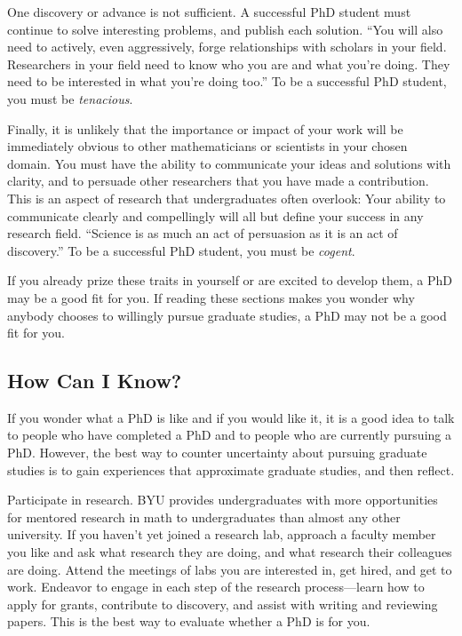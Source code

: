 \documentclass[11pt]{article}
\begin{document}
One discovery or advance is not sufficient. A successful PhD student must continue to solve interesting problems, and publish each solution. ``You will also need to actively, even aggressively, forge relationships with scholars in your field. Researchers in your field need to know who you are and what you're doing. They need to be interested in what you're doing too.'' To be a successful PhD student, you must be \emph{tenacious}.

Finally, it is unlikely that the importance or impact of your work will be immediately obvious to other mathematicians or scientists in your chosen domain. You must have the ability to communicate your ideas and solutions with clarity, and to persuade other researchers that you have made a contribution. This is an aspect of research that undergraduates often overlook: Your ability to communicate clearly and compellingly will all but define your success in any research field. ``Science is as much an act of persuasion as it is an act of discovery.'' To be a successful PhD student, you must be \emph{cogent}.

If you already prize these traits in yourself or are excited to develop them, a PhD may be a good fit for you. If reading these sections makes you wonder why anybody chooses to willingly pursue graduate studies, a PhD may not be a good fit for you.

\subsection{How Can I Know?}
If you wonder what a PhD is like and if you would like it, it is a good idea to talk to people who have completed a PhD and to people who are currently pursuing a PhD. However, the best way to counter uncertainty about pursuing graduate studies is to gain experiences that approximate graduate studies, and then reflect.

Participate in research. BYU provides undergraduates with more opportunities for mentored research in math to undergraduates than almost any other university. If you haven't yet joined a research lab, approach a faculty member you like and ask what research they are doing, and what research their colleagues are doing. Attend the meetings of labs you are interested in, get hired, and get to work. Endeavor to engage in each step of the research process—learn how to apply for grants, contribute to discovery, and assist with writing and reviewing papers. This is the best way to evaluate whether a PhD is for you.
\end{document}
